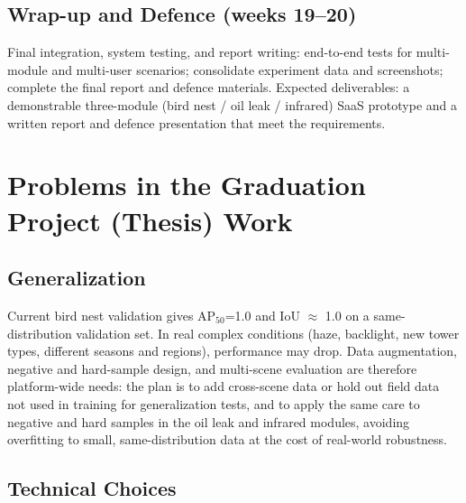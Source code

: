 \documentclass[12pt,a4paper]{article}
\begin{document}
\subsection{Wrap-up and Defence (weeks 19--20)}

Final integration, system testing, and report writing: end-to-end tests for multi-module and multi-user scenarios; consolidate experiment data and screenshots; complete the final report and defence materials. Expected deliverables: a demonstrable three-module (bird nest / oil leak / infrared) SaaS prototype and a written report and defence presentation that meet the requirements.

\section{Problems in the Graduation Project (Thesis) Work}

\subsection{Generalization}

Current bird nest validation gives AP$_{50}$=1.0 and IoU $\approx$ 1.0 on a same-distribution validation set. In real complex conditions (haze, backlight, new tower types, different seasons and regions), performance may drop. Data augmentation, negative and hard-sample design, and multi-scene evaluation are therefore platform-wide needs: the plan is to add cross-scene data or hold out field data not used in training for generalization tests, and to apply the same care to negative and hard samples in the oil leak and infrared modules, avoiding overfitting to small, same-distribution data at the cost of real-world robustness.

\subsection{Technical Choices}
\end{document}
